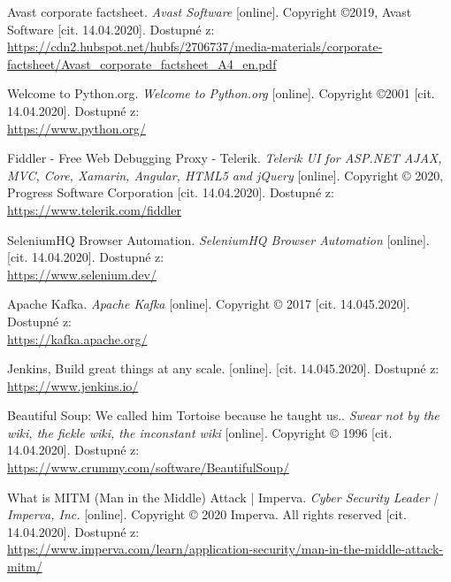 \documentclass[thesis=M,czech,hidelinks]{FITthesis}[2013/05/06]
\begin{document}


\begin{thebibliography}{9}

    Avast corporate factsheet. \textit{Avast Software} [online]. Copyright ©2019, Avast Software [cit. 14.04.2020]. Dostupné z: \\       \url{https://cdn2.hubspot.net/hubfs/2706737/media-materials/corporate-factsheet/Avast_corporate_factsheet_A4_en.pdf}
       	
    
    
    Welcome to Python.org. \textit{Welcome to Python.org} [online]. Copyright ©2001 [cit. 14.04.2020]. Dostupné z: \\ 
     \url{https://www.python.org/}
    
    
    Fiddler - Free Web Debugging Proxy - Telerik. \textit{Telerik UI for ASP.NET AJAX, MVC, Core, Xamarin, Angular, HTML5 and jQuery} [online]. Copyright © 2020, Progress Software Corporation [cit. 14.04.2020]. Dostupné z:  \\ 
    \url{https://www.telerik.com/fiddler}
    
    
    
    SeleniumHQ Browser Automation. \textit{SeleniumHQ Browser Automation} [online]. [cit. 14.04.2020]. Dostupné z: \\
    \url{https://www.selenium.dev/}
    
    
    
    Apache Kafka. \textit{Apache Kafka} [online]. Copyright © 2017 [cit. 14.045.2020]. Dostupné z: \\ \url{https://kafka.apache.org/}
    
    
    Jenkins, Build great things at any scale. [online]. [cit. 14.045.2020]. Dostupné z: \\
    \url{https://www.jenkins.io/}
    
    Beautiful Soup: We called him Tortoise because he taught us.. \textit{Swear not by the wiki, the fickle wiki, the inconstant wiki} [online]. Copyright © 1996 [cit. 14.04.2020]. Dostupné z:     \\  \url{https://www.crummy.com/software/BeautifulSoup/} 	

    
    What is MITM (Man in the Middle) Attack | Imperva. \textit{Cyber Security Leader | Imperva, Inc.} [online]. Copyright © 2020 Imperva. All rights reserved [cit. 14.04.2020]. Dostupné z:  \\ 
    \url{https://www.imperva.com/learn/application-security/man-in-the-middle-attack-mitm/}



\end{thebibliography}
\end{document}

